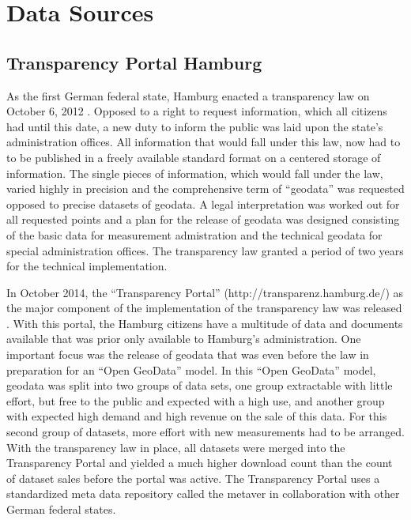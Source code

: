 \documentclass[a4paper, 11pt, oneside]{Thesis}  %
\begin{document}
\chapter{Data Sources}


\section{Transparency Portal Hamburg}
As the first German federal state, Hamburg enacted a transparency law on October 6, 2012 \cite{Murjahn.2016}. Opposed to a right to request information, which all citizens had until this date, a new duty to inform the public was laid upon the state’s administration offices. All information that would fall under this law, now had to to be published in a freely available standard format on a centered storage of information. The single pieces of information, which would fall under the law, varied highly in precision and the comprehensive term of ``geodata'' was requested opposed to precise datasets of geodata. A legal interpretation was worked out for all requested points and a plan for the release of geodata was designed consisting of the basic data for measurement admistration and the technical geodata for special administration offices. The transparency law granted a period of two years for the technical implementation.

In October 2014, the ``Transparency Portal'' (http://transparenz.hamburg.de/) as the major component of the implementation of the transparency law was released \cite{Murjahn.2016}. With this portal, the Hamburg citizens have a multitude of data and documents available that was prior only available to Hamburg's administration. One important focus was the release of geodata that was even before the law in preparation for an ``Open GeoData'' model. In this ``Open GeoData'' model, geodata was split into two groups of data sets, one group extractable with little effort, but free to the public and expected with a high use, and another group with expected high demand and high revenue on the sale of this data. For this second group of datasets, more effort with new measurements had to be arranged. With the transparency law in place, all datasets were merged into the Transparency Portal and yielded a much higher download count than the count of dataset sales before the portal was active. The Transparency Portal uses a standardized meta data repository called the \ac{metaver} in collaboration with other German federal states.
\end{document}
